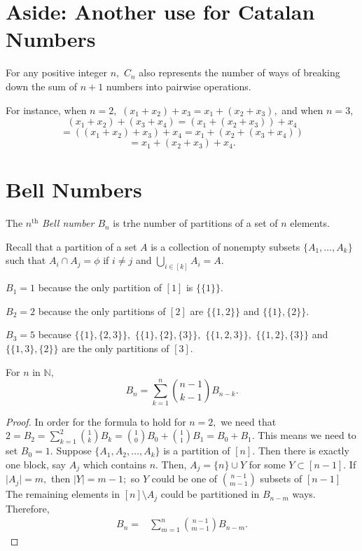 \section{Aside: Another use for Catalan Numbers}
For any positive integer $n,$ $C_n$ also represents the number of ways
of breaking down the sum of $n+1$ numbers into pairwise operations.

For instance, when $n=2,$
$(x_1+  x_2) + x_3 = x_1  +(x_2 + x_3),$ and
when $n=3,$ 
$$(x_1 + x_2) + (x_3 + x_4) = (x_1 + (x_2 + x_3)) + x_4 $$
$$ = ((x_1 + x_2) + x_3) + x_4 = x_1 + (x_2 + (x_3 + x_4))$$
$$ = x_1 + (x_2 + x_3 ) +x_4 .$$

\section{Bell Numbers}
\begin{definition}
The $n^\text{th}$ \emph{Bell number $B_n$} is trhe number of partitions
of a set of $n$ elements.
\end{definition}

Recall that a partition of a set $A$ is a collection of nonempty
subsets $ \{ A_1, \dotsc, A_k\}$ such that 
$A_i \cap A_j =  \phi$ if $i \not = j$ and $\bigcup_{i \in [k]} A_i = A.$

\begin{example}
	$B_1 = 1$ because the only partition of $[1]$ is $\{\{1\}\}.$

	$B_2 = 2$ because the only partitions of $[2]$ are
	$\{ \{ 1,2\} \}$ and $\{ \{1\}, \{2\} \}.$

	$B_3 = 5$ because $\{ \{ 1\} , \{ 2, 3\} \},$ 
	$\{ \{1 \}, \{2\}, \{3\}\},$ $\{ \{ 1,2,3\}\},$
	$\{ \{1, 2\}, \{3\}\}$ and $\{ \{1,3\}, \{2\}\}$
	are the only partitions of $[3].$
\end{example}

\begin{lemma}
	For $n$ in $\mathbb{N},$
	$$ B_n = \sum_{k = 1}^{n} \binom{n-1}{k-1} B_{n-k}.$$
\end{lemma}

\begin{proof}
	In order for the formula to hold for $n=2,$ we need that	$2 = B_2 = \sum_{k=1}^{2} \binom{1}{k} B_k
	= \binom{1}{0} B_0 + \binom{1}{1} B_1
	= B_0 + B_1.$
	This means we need to set $B_0 = 1.$
	Suppose $ \{ A_1, A_2, \dotsc, A_k \}$ is a partition of $[n].$
	Then there is exactly one block, say $A_j$ which contains $n.$
	Then, $A_j = \{n\} \cup Y$ for some $ Y \subset [n-1].$
	If $ \lvert A_j \rvert = m,$ then $ \lvert Y \rvert = m-1;$ 
	so $Y$ could be one of $\binom{n-1}{m-1}$ subsets of $[n-1]$
	The remaining elements in $[n] \setminus A_j$ could be 
	partitioned in $B_{n-m}$ ways.
	Therefore,
	\begin{align*}
		B_n ={}&  \sum_{m=1}^{n} \binom{n-1}{m-1} B_{n-m}.
	\end{align*}
\end{proof}

